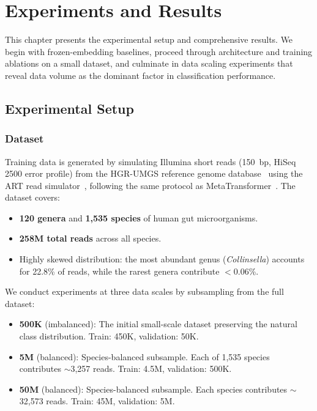 
\chapter{Experiments and Results}
\label{ch:experiments}

This chapter presents the experimental setup and comprehensive results. We begin with frozen-embedding baselines, proceed through architecture and training ablations on a small dataset, and culminate in data scaling experiments that reveal data volume as the dominant factor in classification performance.

\section{Experimental Setup}
\label{sec:exp-setup}

\subsection{Dataset}

Training data is generated by simulating Illumina short reads (150~bp, HiSeq 2500 error profile) from the HGR-UMGS reference genome database~\cite{Almeida2019} using the ART read simulator~\cite{Huang2012}, following the same protocol as MetaTransformer~\cite{Wichmann2023}. The dataset covers:
\begin{itemize}
    \item \textbf{120 genera} and \textbf{1,535 species} of human gut microorganisms.
    \item \textbf{258M total reads} across all species.
    \item Highly skewed distribution: the most abundant genus (\textit{Collinsella}) accounts for 22.8\% of reads, while the rarest genera contribute $<$0.06\%.
\end{itemize}

We conduct experiments at three data scales by subsampling from the full dataset:
\begin{itemize}
    \item \textbf{500K} (imbalanced): The initial small-scale dataset preserving the natural class distribution. Train: 450K, validation: 50K.
    \item \textbf{5M} (balanced): Species-balanced subsample. Each of 1,535 species contributes $\sim$3,257 reads. Train: 4.5M, validation: 500K.
    \item \textbf{50M} (balanced): Species-balanced subsample. Each species contributes $\sim$32,573 reads. Train: 45M, validation: 5M.
\end{itemize}

